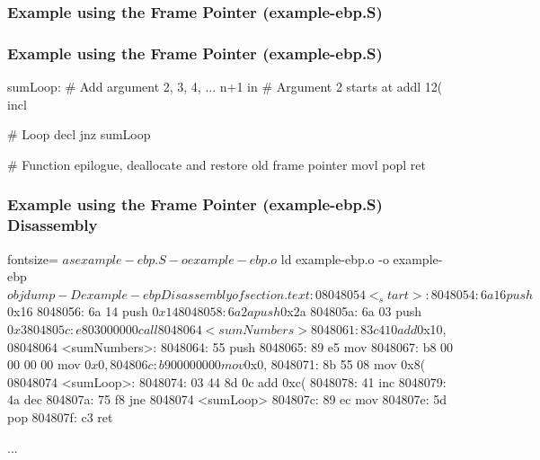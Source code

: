 \documentclass[11pt,xcolor=dvipsnames]{beamer}
\newcommand{\mvs}{\vspace{-0.95em}}
\begin{document}
\begin{frame}[fragile,t]
\frametitle{Example using the Frame Pointer (example-ebp.S)}
\mvs
{}
\end{frame}

\begin{frame}[fragile,t]
\frametitle{Example using the Frame Pointer (example-ebp.S)}
\mvs
\begin{gascode}
    sumLoop:
      # Add argument 2, 3, 4, ... n+1 in %
      # Argument 2 starts at %
      addl 12(%
      incl %

      # Loop
      decl %
      jnz sumLoop

    # Function epilogue, deallocate and restore old frame pointer
    movl %
    popl %
    ret
\end{gascode}
\end{frame}

\begin{frame}[fragile,t]
\frametitle{Example using the Frame Pointer (example-ebp.S) Disassembly}
\mvs
\begin{customobjdumpcode*}{fontsize=\fontsize{8}{8}}
$ as example-ebp.S -o example-ebp.o
$ ld example-ebp.o -o example-ebp
$ objdump -D example-ebp

Disassembly of section .text:

08048054 <_start>:
 8048054:   6a 16                   push   $0x16
 8048056:   6a 14                   push   $0x14
 8048058:   6a 2a                   push   $0x2a
 804805a:   6a 03                   push   $0x3
 804805c:   e8 03 00 00 00          call   8048064 <sumNumbers>
 8048061:   83 c4 10                add    $0x10,%
08048064 <sumNumbers>:
 8048064:   55                      push   %
 8048065:   89 e5                   mov    %
 8048067:   b8 00 00 00 00          mov    $0x0,%
 804806c:   b9 00 00 00 00          mov    $0x0,%
 8048071:   8b 55 08                mov    0x8(%
08048074 <sumLoop>:
 8048074:   03 44 8d 0c             add    0xc(%
 8048078:   41                      inc    %
 8048079:   4a                      dec    %
 804807a:   75 f8                   jne    8048074 <sumLoop>
 804807c:   89 ec                   mov    %
 804807e:   5d                      pop    %
 804807f:   c3                      ret    

...
\end{customobjdumpcode*}
\end{frame}
\end{document}
